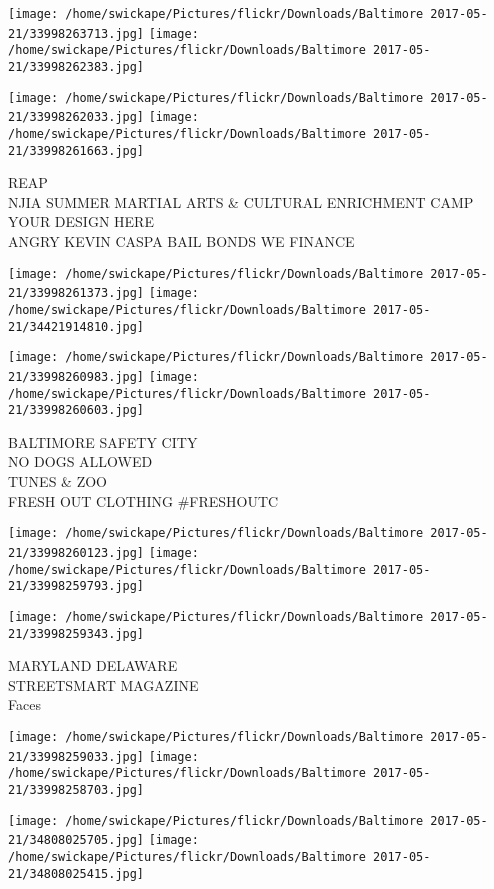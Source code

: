 \documentclass[10pt,letterpaper]{article}
\begin{document}
\texttt{[image: /home/swickape/Pictures/flickr/Downloads/Baltimore 2017-05-21/33998263713.jpg]}
\texttt{[image: /home/swickape/Pictures/flickr/Downloads/Baltimore 2017-05-21/33998262383.jpg]}

\texttt{[image: /home/swickape/Pictures/flickr/Downloads/Baltimore 2017-05-21/33998262033.jpg]}
\texttt{[image: /home/swickape/Pictures/flickr/Downloads/Baltimore 2017-05-21/33998261663.jpg]}

REAP\\
NJIA SUMMER MARTIAL ARTS \& CULTURAL ENRICHMENT CAMP\\
YOUR DESIGN HERE\\
ANGRY KEVIN CASPA BAIL BONDS WE FINANCE
\pagebreak

\texttt{[image: /home/swickape/Pictures/flickr/Downloads/Baltimore 2017-05-21/33998261373.jpg]}
\texttt{[image: /home/swickape/Pictures/flickr/Downloads/Baltimore 2017-05-21/34421914810.jpg]}

\texttt{[image: /home/swickape/Pictures/flickr/Downloads/Baltimore 2017-05-21/33998260983.jpg]}
\texttt{[image: /home/swickape/Pictures/flickr/Downloads/Baltimore 2017-05-21/33998260603.jpg]}

BALTIMORE SAFETY CITY\\
NO DOGS ALLOWED\\
TUNES \& ZOO\\
FRESH OUT CLOTHING \#FRESHOUTC
\pagebreak

\texttt{[image: /home/swickape/Pictures/flickr/Downloads/Baltimore 2017-05-21/33998260123.jpg]}
\texttt{[image: /home/swickape/Pictures/flickr/Downloads/Baltimore 2017-05-21/33998259793.jpg]}

\vspace{0.25in}
\texttt{[image: /home/swickape/Pictures/flickr/Downloads/Baltimore 2017-05-21/33998259343.jpg]}

MARYLAND DELAWARE\\
STREETSMART MAGAZINE\\
Faces
\pagebreak

\texttt{[image: /home/swickape/Pictures/flickr/Downloads/Baltimore 2017-05-21/33998259033.jpg]}
\texttt{[image: /home/swickape/Pictures/flickr/Downloads/Baltimore 2017-05-21/33998258703.jpg]}

\texttt{[image: /home/swickape/Pictures/flickr/Downloads/Baltimore 2017-05-21/34808025705.jpg]}
\texttt{[image: /home/swickape/Pictures/flickr/Downloads/Baltimore 2017-05-21/34808025415.jpg]}
\end{document}
